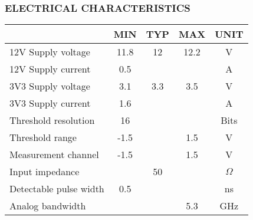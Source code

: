 \subsubsection*{ELECTRICAL CHARACTERISTICS}
\begin{table}[h]
    \begin{tabularx}{\textwidth}{|X|c|c|c|c|}
        \hline
                                       & \textbf{ MIN } & \textbf{ TYP } & \textbf{MAX} & \textbf{  UNIT  } \\
        \hline
        12V Supply voltage             & 11.8           & 12             & 12.2         & V                 \\
        \hline
        12V Supply current             & 0.5            &                &              & A                 \\
        \hline
        3V3 Supply voltage             & 3.1            & 3.3            & 3.5          & V                 \\
        \hline
        3V3 Supply current             & 1.6            &                &              & A                 \\
        \hline
        Threshold resolution           & 16             &                &              & Bits              \\
        \hline
        Threshold range                & -1.5           &                & 1.5          & V                 \\
        \hline
        Measurement channel            & -1.5           &                & 1.5          & V                 \\
        \hline
        Input impedance                &                & 50             &              & $\Omega$          \\
        \hline
        Detectable pulse width         & 0.5            &                &              & ns                \\
        \hline
        Analog bandwidth               &                &                & 5.3          & GHz               \\
        \hline
    \end{tabularx}
\end{table}
